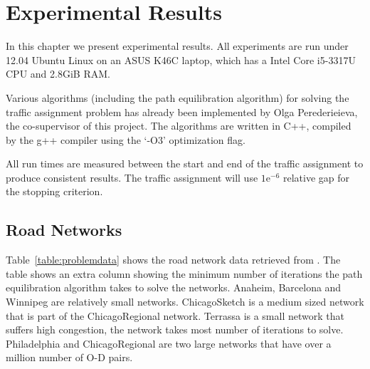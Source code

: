 \chapter{Experimental Results}\label{chap:results}

In this chapter we present experimental results.
All experiments are run under 12.04 Ubuntu Linux on an ASUS K46C laptop,
which has a Intel Core i5-3317U CPU and 2.8GiB RAM.

Various algorithms (including the path equilibration algorithm) for solving
the traffic assignment problem has already been implemented by Olga Perederieieva, the co-supervisor of this project.
The algorithms are written in C++, compiled by the g++ compiler using the `-O3' optimization flag.

All run times are measured between the start and end of the traffic assignment
to produce consistent results.
The traffic assignment will use $1\text{e}^{-6}$ relative gap for the stopping criterion.

\section{Road Networks}

Table~\ref{table:problemdata} shows the road network data retrieved from \citet{ProblemData}.
The table shows an extra column showing the minimum number of iterations the path equilibration algorithm takes to solve the networks.
Anaheim, Barcelona and Winnipeg are relatively small networks.
ChicagoSketch is a medium sized network that is part of the ChicagoRegional network.
Terrassa is a small network that suffers high congestion, the network takes most number of iterations to solve.
Philadelphia and ChicagoRegional are two large networks that have over a million number of O-D pairs.

